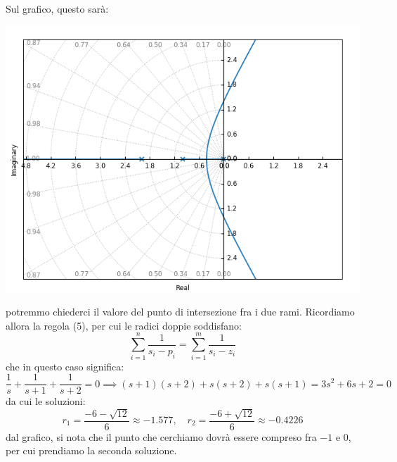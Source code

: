 \documentclass[a4paper,11pt]{article}
\begin{document}
\begin{enumerate}
	Sul grafico, questo sarà:
	\begin{center}
		\includegraphics[scale=0.8]{../figures/rlocus/1320.png}
	\end{center}
	potremmo chiederci il valore del punto di intersezione fra i due rami.
	Ricordiamo allora la regola (5), per cui le radici doppie soddisfano:
	$$
	\sum_{i = 1}^n \frac{1}{s_i - p_i} = \sum_{i = 1}^m \frac{1}{s_i - z_i}
	$$
	che in questo caso significa:
	$$
	\frac{1}{s} + \frac{1}{s + 1} + \frac{1}{s + 2} = 0 \implies (s + 1) (s + 2) + s (s + 2) + s (s + 1) = 3s^2 + 6s + 2 = 0
	$$
	da cui le soluzioni:
	$$
		r_1 = \frac{-6 - \sqrt{12}}{6} \approx -1.577, \quad r_2 = \frac{-6 + \sqrt{12}}{6} \approx -0.4226
	$$
	dal grafico, si nota che il punto che cerchiamo dovrà essere compreso fra $-1$ e $0$, per cui prendiamo la seconda soluzione.

		\par\medskip
		\noindent
		\textbf{}


\end{enumerate}
\end{document}
